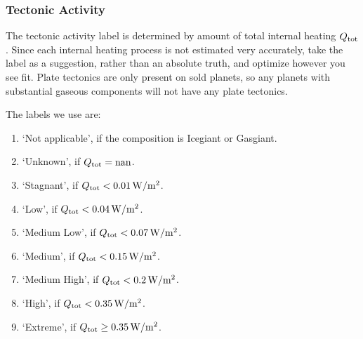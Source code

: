 \documentclass[letterpaper,10pt,english]{sphinxmanual}
\begin{document}
\subsubsection{Tectonic Activity}
\label{\detokenize{quantities/surface/internal_heating/tectonic_activity:tectonic-activity}}\label{\detokenize{quantities/surface/internal_heating/tectonic_activity::doc}}\label{\detokenize{quantities/surface/internal_heating/tectonic_activity:id1}}
\sphinxAtStartPar
The tectonic activity label is determined by amount of total internal heating \(Q_{\rm tot}\).
Since each internal heating process is not estimated very accurately, take the
label as a suggestion, rather than an absolute truth, and optimize however you see fit.
Plate tectonics are only present on sold planets, so any planets with substantial gaseous
components will not have any plate tectonics.

\sphinxAtStartPar
The labels we use are:
\begin{enumerate}
%
\item {} 
\sphinxAtStartPar
‘Not applicable’, if the composition is Icegiant or Gasgiant.

\item {} 
\sphinxAtStartPar
‘Unknown’, if \(Q_{\rm tot} = {\rm nan}\).

\item {} 
\sphinxAtStartPar
‘Stagnant’, if \(Q_{\rm tot} < 0.01 \, {\rm W/m^2}\).

\item {} 
\sphinxAtStartPar
‘Low’, if \(Q_{\rm tot} < 0.04 \, {\rm W/m^2}\).

\item {} 
\sphinxAtStartPar
‘Medium Low’, if \(Q_{\rm tot} < 0.07 \, {\rm W/m^2}\).

\item {} 
\sphinxAtStartPar
‘Medium’, if \(Q_{\rm tot} < 0.15 \, {\rm W/m^2}\).

\item {} 
\sphinxAtStartPar
‘Medium High’, if \(Q_{\rm tot} < 0.2 \, {\rm W/m^2}\).

\item {} 
\sphinxAtStartPar
‘High’, if \(Q_{\rm tot} < 0.35 \, {\rm W/m^2}\).

\item {} 
\sphinxAtStartPar
‘Extreme’, if \(Q_{\rm tot} \ge 0.35 \, {\rm W/m^2}\).

\end{enumerate}
\end{document}
